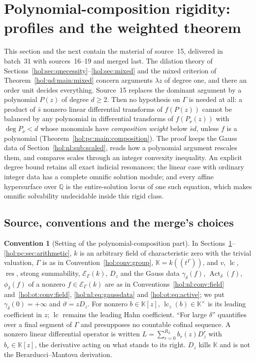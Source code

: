 \documentclass[11pt]{article}
\numberwithin{equation}{section}
\theoremstyle{definition}
\newtheorem{convention}[theorem]{Convention}
\theoremstyle{remark}
\newcommand{\Q}{\mathbb Q}
\newcommand{\lc}{\operatorname{lc}}
\newcommand{\res}{\operatorname{res}}
\newcommand{\KK}{\mathbb K}
\newcommand{\EK}{\mathcal E_\Gamma(k)}
\begin{document}
\section{Polynomial-composition rigidity: profiles and the weighted theorem}
\label{hol:pc:sec:setting}

This section and the next contain the material of source~15, delivered in
batch~31 with sources~16--19 and merged last. The dilation theory of
Sections~\ref{hol:sec:qnecessity}--\ref{hol:sec:mixed} and the mixed criterion
of Theorem~\ref{hol:ud:main:mixed} concern arguments $\lambda z$ of degree one,
and there an order unit decides everything. Source~15 replaces the dominant
argument by a polynomial $P(z)$ of degree $d\ge2$. Then no hypothesis on
$\Gamma$ is needed at all: a product of $\bar s$ nonzero linear differential
transforms of $f(P(z))$ cannot be balanced by any polynomial in differential
transforms of $f(P_\nu(z))$ with $\deg P_\nu<d$ whose monomials have
\emph{composition weight} below $\bar sd$, unless $f$ is a polynomial
(Theorem~\ref{hol:pc:main:composition}). The proof keeps the Gauss data of
Section~\ref{hol:nl:sub:scaled}, reads how a polynomial argument rescales them,
and compares scales through an integer convexity inequality. An explicit
degree bound retains all exact indicial resonances; the linear case with
ordinary integer data has a complete omnific solution module; and every affine
hypersurface over $\Q$ is the entire-solution locus of one such equation,
which makes omnific solvability undecidable inside this rigid class.

\subsection{Source, conventions and the merge's choices}
\label{hol:pc:sub:conventions}

\begin{convention}[Setting of the polynomial-composition part]
\label{hol:pc:conv:field}
In Sections~\ref{hol:pc:sec:setting}--\ref{hol:pc:sec:arithmetic}, $k$ is an
arbitrary field of characteristic zero with the trivial valuation, $\Gamma$ is
as in Convention~\ref{hol:conv:group}, $\KK=k((t^\Gamma))$, and $v$, $\lc$,
$\res$, strong summability, $\EK$, $D_z$ and the Gauss data
$\gamma_\delta(f)$, $\operatorname{Act}_\delta(f)$, $\phi_\delta(f)$ of a nonzero
$f\in\EK$ are as in Conventions~\ref{hol:nl:conv:field}
and~\ref{hol:ot:conv:field}, \eqref{hol:nl:eq:gaussdata} and
\eqref{hol:ot:eq:active}; we put $\gamma_\delta(0)=+\infty$ and
$\vartheta=zD_z$. For nonzero $b\in\KK[z]$, $\lc_z(b)\in\KK^\times$ is its
leading coefficient in $z$; $\lc$ remains the leading Hahn coefficient. ``For large
$\delta$'' quantifies over a final segment of $\Gamma$ and presupposes no
countable cofinal sequence. A nonzero linear differential operator is written
$L=\sum_{r=0}^{R_L}b_r(z)D_z^r$ with $b_r\in\KK[z]$, the derivative acting on
what stands to its right. $D_z$ kills $\KK$ and is not the Berarducci--Mantova
derivation.
\end{convention}
\end{document}
